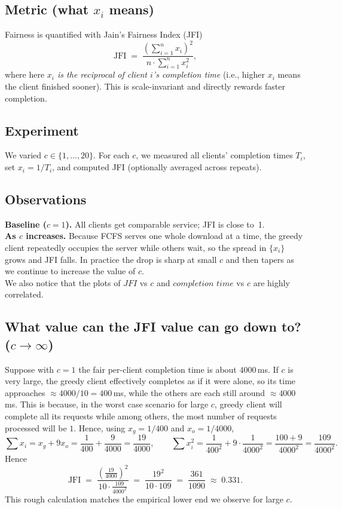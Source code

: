 \documentclass[11pt,a4paper]{article}
\begin{document}
\subsection{Metric (what $x_i$ means)}
Fairness is quantified with Jain's Fairness Index (JFI)
\[
\mathrm{JFI} \;=\; \frac{\left(\sum_{i=1}^n x_i\right)^2}{n \cdot \sum_{i=1}^n x_i^2},
\]
where here \emph{$x_i$ is the reciprocal of client $i$'s completion time} (i.e., higher $x_i$ means the client finished sooner). This is scale-invariant and directly rewards faster completion.

\subsection{Experiment}
We varied $c \in \{1,\dots,20\}$. For each $c$, we measured all clients' completion times $T_i$, set $x_i = 1/T_i$, and computed JFI (optionally averaged across repeats).

\subsection{Observations}
\textbf{Baseline ($c=1$).} All clients get comparable service; JFI is close to~1.\\
\textbf{As $c$ increases.} Because FCFS serves one whole download at a time, the greedy client repeatedly occupies the server while others wait, so the spread in $\{x_i\}$ grows and JFI falls. In practice the drop is sharp at small $c$ and then tapers as we continue to increase the value of $c$. \\
We also notice that the plots of $JFI$ vs $c$ and $completion$ $time$ vs $c$ are highly correlated. 

\subsection{What value can the JFI value can go down to? (\(c \rightarrow \infty\))}
Suppose with $c=1$ the fair per-client completion time is about $4000$\,ms. If $c$ is very large, the greedy client effectively completes as if it were alone, so its time approaches $\approx 4000/10=400$\,ms, while the others are each still around $\approx 4000$\,ms. This is because, in the worst case scenario for large $c$, greedy client will complete all its requests while among others, the most number of requests processed will be $1$. Hence, using $x_g=1/400$ and $x_o=1/4000$,
\[
\sum x_i = x_g + 9x_o = \frac{1}{400}+\frac{9}{4000} = \frac{19}{4000},\qquad
\sum x_i^2 = \frac{1}{400^2} + 9\cdot \frac{1}{4000^2} = \frac{100+9}{4000^2} = \frac{109}{4000^2}.
\]
Hence
\[
\mathrm{JFI} \;=\; \frac{\left(\frac{19}{4000}\right)^2}{10 \cdot \frac{109}{4000^2}}
\;=\; \frac{19^2}{10 \cdot 109}
\;=\; \frac{361}{1090}
\;\approx\; 0.331.
\]
This rough calculation matches the empirical lower end we observe for large $c$.
\end{document}
